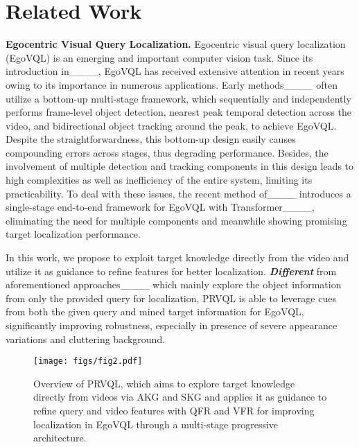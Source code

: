 \section{Related Work}

\textbf{Egocentric Visual Query Localization.} Egocentric visual query localization (EgoVQL) is an emerging and important computer vision task. Since its introduction in____, EgoVQL has received extensive attention in recent years owing to its importance in numerous applications. Early methods____ often utilize a bottom-up multi-stage framework, which sequentially and independently performs frame-level object detection, nearest peak temporal detection across the video, and bidirectional object tracking around the peak, to achieve EgoVQL. Despite the straightforwardness, this bottom-up design easily causes compounding errors across stages, thus degrading performance. Besides, the involvement of multiple detection and tracking components in this design leads to high complexities as well as inefficiency of the entire system, limiting its practicability. To deal with these issues, the recent method of____ introduces a single-stage end-to-end framework for EgoVQL with Transformer____, eliminating the need for multiple components and meanwhile showing promising target localization performance.

In this work, we propose to exploit target knowledge directly from the video and utilize it as guidance to refine features for better localization. \textbf{\emph{Different}} from aforementioned approaches____ which mainly explore the object information from only the provided query for localization, PRVQL is able to leverage cues from both the given query and mined target information for EgoVQL, significantly improving robustness, especially in presence of severe appearance variations and cluttering background.

\begin{figure*}[!t]
	\centering
        \texttt{[image: figs/fig2.pdf]}\vspace{-2mm}
	\caption{Overview of PRVQL, which aims to explore target knowledge directly from videos via AKG and SKG and applies it as guidance to refine query and video features with QFR and VFR for improving localization in EgoVQL through a multi-stage progressive architecture.}
	\label{fig:framework}\vspace{-4mm}	
\end{figure*}

